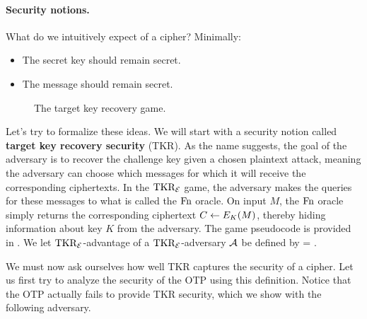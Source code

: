\paragraph{Security notions.} What do we intuitively expect of a cipher?
Minimally:
\begin{itemize}
\item The secret key should remain secret.
\item The message should remain secret.
\end{itemize}

\begin{wrapfigure}[13]{r}{0pt}
	\caption{The target key recovery game.}
	\label{fig:tkr}
\end{wrapfigure}

Let's try to formalize these ideas. We will start with a security notion called \textbf{target key recovery security} (TKR).
As the name suggests, the goal of the adversary is to recover the challenge key given a chosen plaintext attack, meaning the adversary can choose which messages for which it will receive the corresponding ciphertexts. In the $\textnormal{TKR}_{\cal E}$ game, the adversary makes the queries for these messages to what is called the $\textnormal{Fn}$ oracle. On input $M$, the $\textnormal{Fn}$ oracle simply returns the corresponding ciphertext $C \gets E_K(M)$, thereby hiding information about key $K$ from the adversary. 
 The game pseudocode is provided in . We let $\textnormal{TKR}_{\cal E}$-advantage of a $\textnormal{TKR}_{\cal E}$-adversary ${\mathcal A}$ be defined by 
\bnm
\AdvTKR{\cipher}{\advA} = \Prob{\TKR^\advA_\cipherE \Rightarrow\true}  \;.
\enm

We must now ask ourselves how well TKR captures the security of a cipher. Let us first try to analyze the security of the OTP using this definition. Notice that the OTP actually fails to provide TKR security, which we show with the following adversary.
\begin{center}
\end{center}	

